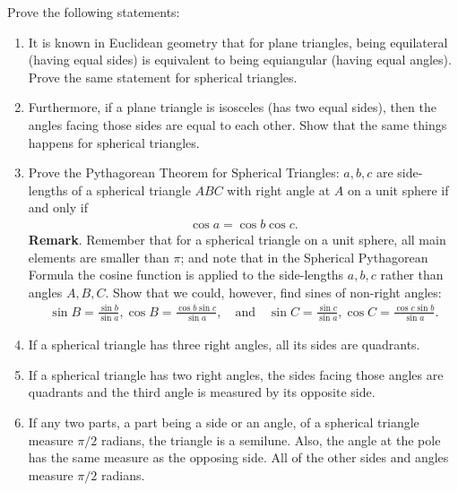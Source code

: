 \documentclass[12pt,a4paper]{memoir}
\theoremstyle{definition}
\begin{document}
	\begin{question} 
		Prove the following statements:
		\begin{enumerate}
			\item It is known in Euclidean geometry that for plane triangles, being equilateral (having equal sides) is equivalent to being equiangular (having equal angles). Prove the same statement for spherical triangles. 
			\item Furthermore, if a plane triangle is isosceles (has two equal sides), then the angles facing those sides are equal to each other. Show that the same things happens for spherical triangles.
			\item Prove the Pythagorean Theorem for Spherical Triangles: $a,b,c$ are side-lengths of a spherical triangle $ABC$ with right angle at $A$ on a unit sphere if and only if
			\vspace{-0.5em}
			\begin{align*}
				\cos a = \cos b \cos c.
			\end{align*}
			\noindent \textbf{Remark}. Remember that for a spherical triangle on a unit sphere, all main elements are smaller than $\pi$; and note that in the Spherical Pythagorean Formula the cosine function is applied to the side-lengths $a,b,c$ rather than angles $A,B,C$. Show that we could, however, find sines of non-right angles:
			\begin{align*}
				\displaystyle\sin B=\frac{\sin b}{\sin a}, \cos B = \frac{\cos b \sin c}{\sin a},\quad \text{and} \quad \sin C=\frac{\sin c}{\sin a},\cos C = \frac{\cos c \sin b}{\sin a}.
			\end{align*}
			\item If a spherical triangle has three right angles, all its sides are quadrants.
			\item If a spherical triangle has two right angles, the sides facing those angles are quadrants and the third angle is measured by its opposite side.
			\item If any two parts, a part being a side or an angle, of a spherical triangle measure $\pi/2$ radians, the triangle is a semilune.
			Also, the angle at the pole has the same measure as the opposing side. All of the other sides and angles measure $\pi/2$ radians.
		\end{enumerate}
	\end{question}
\end{document}
